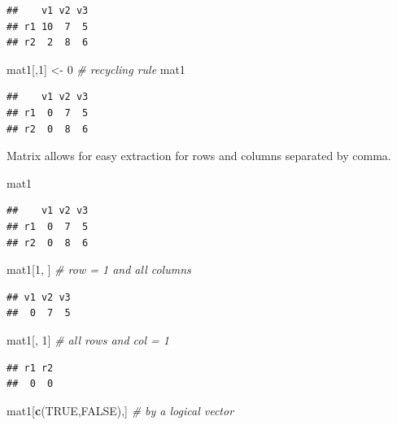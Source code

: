 \documentclass[]{book}
\newenvironment{Shaded}{\begin{snugshade}}{\end{snugshade}}
\newcommand{\KeywordTok}[1]{\textcolor[rgb]{0.13,0.29,0.53}{\textbf{{#1}}}}
\newcommand{\DecValTok}[1]{\textcolor[rgb]{0.00,0.00,0.81}{{#1}}}
\newcommand{\StringTok}[1]{\textcolor[rgb]{0.31,0.60,0.02}{{#1}}}
\newcommand{\CommentTok}[1]{\textcolor[rgb]{0.56,0.35,0.01}{\textit{{#1}}}}
\newcommand{\OtherTok}[1]{\textcolor[rgb]{0.56,0.35,0.01}{{#1}}}
\newcommand{\NormalTok}[1]{{#1}}
\theoremstyle{definition}
\theoremstyle{definition}
\theoremstyle{remark}
\begin{document}
\begin{verbatim}
##    v1 v2 v3
## r1 10  7  5
## r2  2  8  6
\end{verbatim}

\begin{Shaded}
\begin{Highlighting}[]
\NormalTok{mat1[,}\DecValTok{1}\NormalTok{] <-}\StringTok{ }\DecValTok{0}  \CommentTok{# recycling rule}
\NormalTok{mat1}
\end{Highlighting}
\end{Shaded}

\begin{verbatim}
##    v1 v2 v3
## r1  0  7  5
## r2  0  8  6
\end{verbatim}

Matrix allows for easy extraction for rows and columns separated by
comma.

\begin{Shaded}
\begin{Highlighting}[]
\NormalTok{mat1}
\end{Highlighting}
\end{Shaded}

\begin{verbatim}
##    v1 v2 v3
## r1  0  7  5
## r2  0  8  6
\end{verbatim}

\begin{Shaded}
\begin{Highlighting}[]
\NormalTok{mat1[}\DecValTok{1}\NormalTok{, ]  }\CommentTok{# row = 1 and all columns}
\end{Highlighting}
\end{Shaded}

\begin{verbatim}
## v1 v2 v3 
##  0  7  5
\end{verbatim}

\begin{Shaded}
\begin{Highlighting}[]
\NormalTok{mat1[, }\DecValTok{1}\NormalTok{]  }\CommentTok{# all rows and col = 1 }
\end{Highlighting}
\end{Shaded}

\begin{verbatim}
## r1 r2 
##  0  0
\end{verbatim}

\begin{Shaded}
\begin{Highlighting}[]
\NormalTok{mat1[}\KeywordTok{c}\NormalTok{(}\OtherTok{TRUE}\NormalTok{,}\OtherTok{FALSE}\NormalTok{),]  }\CommentTok{# by a logical vector }
\end{Highlighting}
\end{Shaded}
\end{document}
